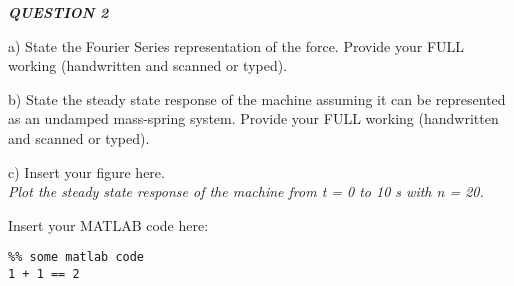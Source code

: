 \begin{tcolorbox}[colback=gray!50,enhanced,sharp corners,frame hidden,halign=left]
    \textbf{\textit{QUESTION 2}}
\end{tcolorbox}

a) State the Fourier Series representation of the force. Provide your FULL working (handwritten and scanned or typed).
\begin{flushright}
    [8 Marks*]
\end{flushright}







\noindent\makebox[\linewidth]{\rule{\linewidth}{0.4pt}}
b) State the steady state response of the machine assuming it can be represented as an undamped mass-spring system. Provide your FULL working (handwritten and scanned or typed).
\begin{flushright}
    [6 Marks*]
\end{flushright}



\noindent\makebox[\linewidth]{\rule{\linewidth}{0.4pt}}
c) Insert your figure here. \\
\textit{Plot the steady state response of the machine from t = 0 to 10 s with n = 20.}
\begin{flushright}
\end{flushright}



\noindent\makebox[\linewidth]{\rule{\linewidth}{0.4pt}}
Insert your MATLAB code here:

\begin{lstlisting}
%% some matlab code
1 + 1 == 2
\end{lstlisting}


\clearpage
